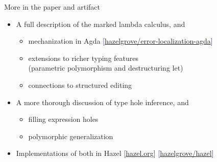 \begin{frame}[fragile]{More in the paper and artifact}
  
  \vspace{-1em}
  \begin{itemize}
    \setlength\itemsep{1.5ex}
    \item A full description of the marked lambda calculus\pause, and

      \begin{itemize}
        \item mechanization in Agda
          \textcolor{MidnightBlue}{[\href{https://github.com/hazelgrove/error-localization-agda}{hazelgrove/error-localization-agda}]} \ 

          \pause
        \item extensions to richer typing features \\ \pause
          (parametric polymorphism and destructuring let)

          \pause
        \item connections to structured editing
      \end{itemize}

      \pause
    \item A more thorough discussion of type hole inference\pause, and

      \begin{itemize}
        \item filling expression holes

          \pause
        \item polymorphic generalization
      \end{itemize}

      \pause
    \item Implementations of both in Hazel
      \textcolor{BrickRed}{\small[\href{https://hazel.org}{hazel.org}]}
      \textcolor{MidnightBlue}{\small[\href{https://github.com/hazelgrove/hazel}{hazelgrove/hazel}]}
  \end{itemize}


\end{frame}
